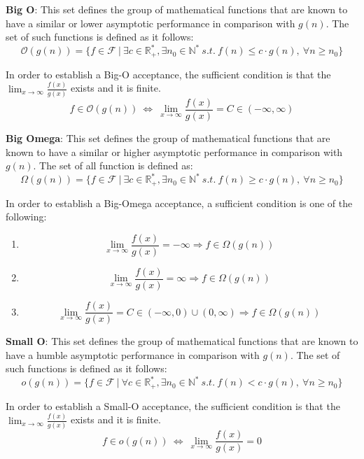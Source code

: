 \begin{definition}   
  \textbf{Big O}: This set defines the group of mathematical functions that are known to have a similar or lower
 asymptotic performance in comparison with  $g(n)$. The set of such functions is defined as it follows:
  \[\mathcal{O}(g(n)) = \lbrace f \in \mathcal{F}\ |\ \exists c \in \mathbb{R}^{*}_{+}, \exists n_{0} \in \mathbb{N}^{*}\ s.t.\  f(n) \leq c \cdot g(n),\  \forall n \geq n_{0} \rbrace\]
  \end{definition}  
  \begin{lemma}
  In order to establish a Big-O acceptance, the sufficient condition is that the $ \lim_{x\to\infty} \frac{f(x)}{g(x)}$ exists and it is finite. 
  \[ f \in \mathcal{O}(g(n))\ \Leftrightarrow\ \lim_{x\to\infty} \frac{f(x)}{g(x)} = C \in (-\infty, \infty) \]
  \end{lemma}

  
\begin{definition}   
 \textbf{Big Omega}: This set defines the group of mathematical functions that are known to have a similar or higher asymptotic performance in comparison with  $g(n)$. The set of all function is defined as:
    \[\Omega(g(n)) = \lbrace f \in \mathcal{F}\ |\ \exists c \in \mathbb{R}^{*}_{+}, \exists n_{0} \in \mathbb{N}^{*}\ s.t.\  f(n) \geq c \cdot g(n),\  \forall n \geq n_{0} \rbrace\]
\end{definition}  

  \begin{lemma}
  In order to establish a Big-Omega acceptance, a sufficient condition is one of the following:
    \begin{enumerate}[label=(\roman*)]

   \item  \[  \lim_{x\to\infty} \frac{f(x)}{g(x)} = -\infty \Rightarrow f \in \Omega(g(n))\ \]
   \item  \[ \lim_{x\to\infty} \frac{f(x)}{g(x)} = \infty \Rightarrow f \in \Omega(g(n))\  \]
    \item  \[ \lim_{x\to\infty} \frac{f(x)}{g(x)} = C \in (-\infty, 0) \cup (0,\infty) \Rightarrow f \in \Omega(g(n))\ \]
	\end{enumerate}
   \end{lemma}
   
\begin{definition}   
 \textbf{Small O}:
  This set defines the group of mathematical functions that are known to have a humble
 asymptotic performance in comparison with  $g(n)$. The set of such functions is defined as it follows:
  \[o(g(n)) = \lbrace f \in \mathcal{F}\ |\ \forall c \in \mathbb{R}^{*}_{+}, \exists n_{0} \in \mathbb{N}^{*}\ s.t.\  f(n) < c \cdot g(n),\  \forall n \geq n_{0} \rbrace\]
  \end{definition}  
  \begin{lemma}
In order to establish a Small-O acceptance, the sufficient condition is that the $ \lim_{x\to\infty} \frac{f(x)}{g(x)}$ exists and it is finite. 
  \[ f \in o(g(n))\ \Leftrightarrow\ \lim_{x\to\infty} \frac{f(x)}{g(x)} = 0 \]  
  \end{lemma}
  
